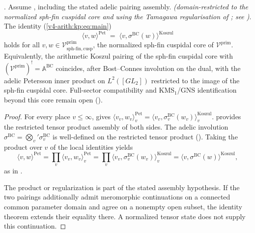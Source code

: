 \begin{theorem}
\label{v4-arith:kp:thm:main-full}
\ClaimStatusProvedHereConditional. Assume , including the stated adelic pairing assembly.  \emph{(domain-restricted to the normalized
sph-fin cuspidal core and using the Tamagawa regularisation of
; see
)}. The identity
(\ref{v4-arith:kp:eq:main})
\begin{equation*}
\langle v,w\rangle^{\mathrm{Pet}}
\;=\;
\langle v,\sigma^{\mathrm{BC}}(w)\rangle^{\mathrm{Koszul}}
\end{equation*}
holds for all
\(v,w\in\mathcal{V}^{\mathrm{prim}}_{\mathrm{sph\text{-}fin,cusp}}\),
the normalized sph-fin cuspidal core of \(\mathcal{V}^{\mathrm{prim}}\).
Equivalently, the arithmetic Koszul pairing of the sph-fin
cuspidal core with
\((\mathcal{V}^{\mathrm{prim}})^{!}=\mathbb{A}^{\mathrm{BC}}\)
coincides, after Bost--Connes involution on the dual, with the
adelic Petersson inner product on \(L^{2}([GL_{2}])\) restricted
to the image of the sph-fin cuspidal core. Full-sector
compatibility and KMS\(_{1}\)/GNS identification beyond this core
remain open
().
\end{theorem}

\begin{proof}
For every place \(v\leq\infty\),
 gives
\(\langle v_{v},w_{v}\rangle^{\mathrm{Pet}}_{v}
=\langle v_{v},\sigma^{\mathrm{BC}}_{v}(w_{v})\rangle^{\mathrm{Koszul}}_{v}\).
 provides the restricted
tensor product assembly of both sides. The adelic involution
\(\sigma^{\mathrm{BC}}=\bigotimes_{v}'\sigma^{\mathrm{BC}}_{v}\)
is well-defined on the restricted tensor product
(). Taking the product
over \(v\) of the local identities yields
\begin{equation*}
\langle v,w\rangle^{\mathrm{Pet}}
=\prod_{v}\langle v_{v},w_{v}\rangle^{\mathrm{Pet}}_{v}
=\prod_{v}\langle v_{v},\sigma^{\mathrm{BC}}_{v}(w_{v})\rangle^{\mathrm{Koszul}}_{v}
=\langle v,\sigma^{\mathrm{BC}}(w)\rangle^{\mathrm{Koszul}},
\end{equation*}
as in .

The product or regularization is part of the stated assembly
hypothesis. If the two pairings additionally admit meromorphic
continuations on a connected common parameter domain and agree on a
nonempty open subset, the identity theorem extends their equality
there. A normalized tensor state does not supply this continuation.
\end{proof}

